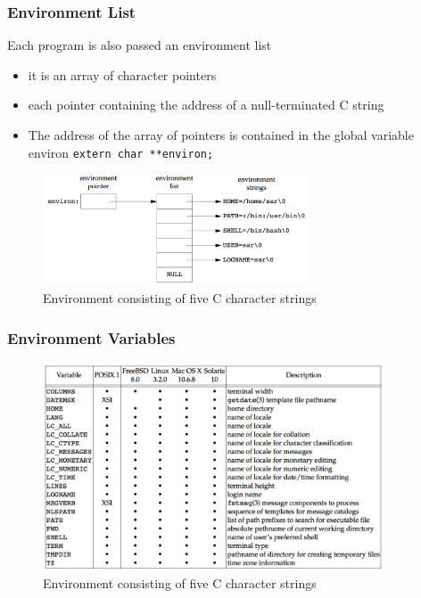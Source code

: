 \documentclass[newPxFont,sthlmFooter,nooffset]{beamer}
\begin{document}
\begin{frame}[t]
  \frametitle{Environment List}
Each program is also passed an environment list 
\begin{itemize}
\item it is an array of character pointers
\item each pointer containing the address of a null-terminated C
  string
\item The address of the array of pointers is contained in the global variable environ \texttt{extern char **environ;}
\end{itemize}

\begin{figure}[h]
  \centering
  \includegraphics[width=0.7\textwidth]{figure/fig7-5_environment.png}
  \caption{Environment consisting of five C character strings}
\end{figure}
\end{frame}

\begin{frame}[t]
  \frametitle{Environment Variables}
\begin{figure}[h]
  \centering
  \includegraphics[width=0.9\textwidth]{figure/fig7-7_environment.png}
  \caption{Environment consisting of five C character strings}
\end{figure}
\end{frame}
\end{document}
